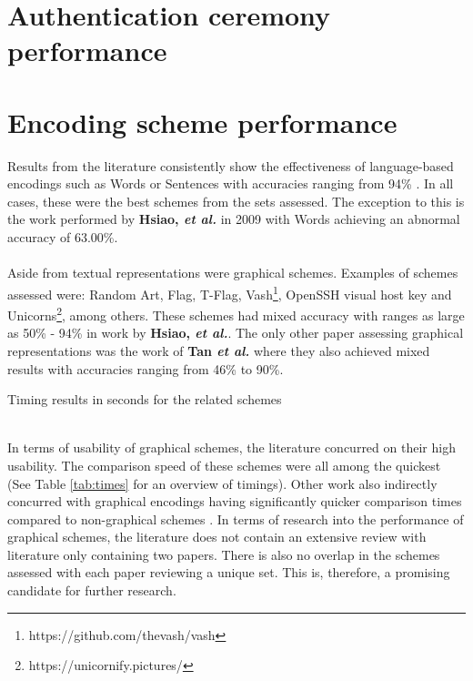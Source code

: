 \section{Authentication ceremony performance}

\section*{Encoding scheme performance}
Results 
from the literature consistently show the effectiveness of language-based encodings such as Words or Sentences with accuracies ranging from 94\% \cite{dechand2016empirical}\cite{tan2017can}\cite{kainda2009usability}. In all cases, these were the best schemes from the sets assessed. The exception to this is the work performed by \textbf{Hsiao, \textit{et al.}}\cite{hsiao2009study} in 2009 with Words achieving an abnormal accuracy of 63.00\%.
\\\\
Aside from textual representations were graphical schemes. Examples of schemes assessed were: Random Art\cite{perrig1999hash}, Flag\cite{ellison2003public}, T-Flag\cite{lin2010spate}, Vash\footnote{https://github.com/thevash/vash}, OpenSSH visual host key and Unicorns\footnote{https://unicornify.pictures/}, among others. These schemes had mixed accuracy with ranges as large as 50\% - 94\% in work by \textbf{Hsiao, \textit{et al.}}\cite{hsiao2009study}. The only other paper assessing graphical representations was the work of \textbf{Tan \textit{et al.}}\cite{tan2017can} where they also achieved mixed results with accuracies ranging from 46\% to 90\%.
\\
\begin{table}[h!]
    \makebox[\textwidth][c]{
        
    }%
    \caption{Timing results in seconds for the related schemes}
    \label{tab:times}
\end{table}
\\
In terms of usability of graphical schemes, the literature concurred on their high usability. The comparison speed of these schemes were all among the quickest (See Table \ref{tab:times} for an overview of timings). Other work also indirectly concurred with graphical encodings having significantly quicker comparison times compared to non-graphical schemes \cite{dechand2016empirical}\cite{kainda2009usability}.
In terms of research into the performance of graphical schemes, the literature does not contain an extensive review with literature only containing two papers. There is also no overlap in the schemes assessed with each paper reviewing a unique set. This is, therefore, a promising candidate for further research.


